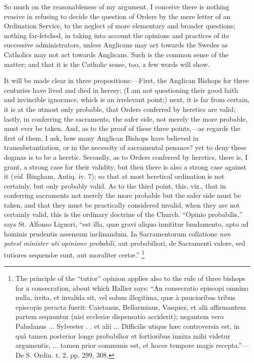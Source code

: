 So much on the reasonableness of my argument. I conceive there is
nothing evasive in refusing to decide the question of Orders by the
mere letter of an Ordination Service, to the neglect of more
elementary and broader questions; nothing far-fetched, in taking into
account the opinions and practices of its successive administrators,
unless Anglicans may act towards the Swedes as Catholics may not act
towards Anglicans. Such is the common sense of the matter; and that it
is the Catholic sense, too, a few words will show.

It will be made clear in three propositions:—First, the Anglican Bishops for three centuries have lived and died in heresy; (I
am not questioning their good faith and invincible ignorance, which is
an irrelevant point;) next, it is far from certain, it is at the
utmost only probable, that Orders conferred by heretics are valid;
lastly, in conferring the sacraments, the safer side, not merely the
more probable, must ever be taken. And, as to the proof of these three
points,—as regards the first of them, I ask, how many Anglican
Bishops have believed in transubstantiation, or in the necessity of
sacramental penance? yet to deny these dogmas is to be a heretic.
Secondly, as to Orders conferred by heretics, there is, I grant, a
strong case for their validity, but then there is also a strong case
against it (\emph{vid}. Bingham, Antiq. iv. 7); so that at most
heretical ordination is not certainly, but only probably valid. As to
the third point, this, viz., that in conferring sacraments not merely
the more probable but the safer side must be taken, and that they must
be practically considered invalid, when they are not certainly valid,
this is the ordinary doctrine of the Church. ``Opinio probabilis,''
says St. Alfonso Liguori, ``est illa, quæ gravi aliquo innititur
fundamento, apto ad hominis prudentis assensum inclinandum. In
Sacramentorum collatione \emph{non potest minister uti opinione probabili},
aut probabiliori, de Sacramenti valore, sed tutiores sequendæ sunt,
aut moraliter certæ.'' \footnote{The principle
of the ``tutior'' opinion applies also to the rule of three
bishops for a consecration, about which Hallier says: ``An
consecratio episcopi omnino nulla, irrita, et invalida sit, vel solum
illegitima, quæ à paucioribus tribus episcopis peracta fuerit:
Caietanus, Bellarminus, Vasquez, et alii affirmantem partem sequuntur
(nisi ecclesiæ dispensatio acciderit); negantem vero Paludanus ...
Sylvester . . et alii ... Difficilis utique hæc controversia est, in
quâ tamen posterior longe probabilior et fortioribus innixa mihi
videtur argumentis, ... tamen prior communis est, et hocce tempore
magis recepta.''—De S. Ordin. t. 2, pp. 299, 308.}
